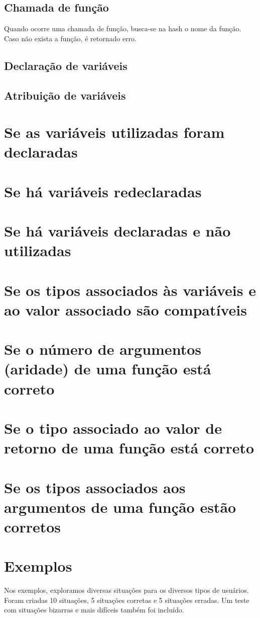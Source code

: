 \documentclass[a4paper,10pt]{article}
\begin{document}
\subsection{Chamada de função}
Quando ocorre uma chamada de função, busca-se na hash o nome da função. Caso não exista a função, é retornado erro.
\subsection{Declaração de variáveis}
\subsection{Atribuição de variáveis}


\section{Se as variáveis utilizadas foram declaradas}
\section{Se há variáveis redeclaradas}
\section{Se há variáveis declaradas e não utilizadas}
\section{Se os tipos associados às variáveis e ao valor associado são compatíveis}
\section{Se o número de argumentos (aridade) de uma função está correto}
\section{Se o tipo associado ao valor de retorno de uma função está correto}
\section{Se os tipos associados aos argumentos de uma função estão corretos}

\section{Exemplos}
Nos exemplos, exploramos diversas situações para os diversos tipos de usuários. Foram criadas 10 situações, 5 situações corretas e 5 
situações erradas. Um teste com situações bizarras e mais difíceis também foi incluído.
\end{document}
